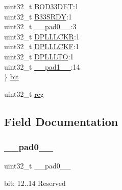 \begin{DoxyCompactItemize}
\begin{tabbing}
\>uint32\_t \mbox{\hyperlink{union_s_y_s_c_t_r_l___i_n_t_e_n_c_l_r___type_afe0d01af66ae30fcd7f3c61067b2bef1}{BOD33DET}}:1\\
\>uint32\_t \mbox{\hyperlink{union_s_y_s_c_t_r_l___i_n_t_e_n_c_l_r___type_a001eb8c699a22ed1e8addd422b0068ae}{B33SRDY}}:1\\
\>uint32\_t \mbox{\hyperlink{union_s_y_s_c_t_r_l___i_n_t_e_n_c_l_r___type_a3e57c2ef1c3ffb36722f000cc1156824}{\_\_pad0\_\_}}:3\\
\>uint32\_t \mbox{\hyperlink{union_s_y_s_c_t_r_l___i_n_t_e_n_c_l_r___type_a0971d1b5df18859d93257da5c619eb64}{DPLLLCKR}}:1\\
\>uint32\_t \mbox{\hyperlink{union_s_y_s_c_t_r_l___i_n_t_e_n_c_l_r___type_ab73a8dbca12f32aad2cc241099afc49f}{DPLLLCKF}}:1\\
\>uint32\_t \mbox{\hyperlink{union_s_y_s_c_t_r_l___i_n_t_e_n_c_l_r___type_ac0397fe777ae420afce8c8ddc23dc843}{DPLLLTO}}:1\\
\>uint32\_t \mbox{\hyperlink{union_s_y_s_c_t_r_l___i_n_t_e_n_c_l_r___type_a6712ba6dd1d5b43d2d56ff8ac4e275a7}{\_\_pad1\_\_}}:14\\
\} \mbox{\hyperlink{union_s_y_s_c_t_r_l___i_n_t_e_n_c_l_r___type_af911c5a0ca56e0ea88635e3012b08fb3}{bit}}\\

\end{tabbing}\item 
uint32\+\_\+t \mbox{\hyperlink{union_s_y_s_c_t_r_l___i_n_t_e_n_c_l_r___type_a6b91636401516a477989a336376d7b40}{reg}}
\end{DoxyCompactItemize}


\subsection{Field Documentation}
\mbox{\label{union_s_y_s_c_t_r_l___i_n_t_e_n_c_l_r___type_a3e57c2ef1c3ffb36722f000cc1156824}} 
\subsubsection{\texorpdfstring{\_\_pad0\_\_}{\_\_pad0\_\_}}
{\footnotesize\ttfamily uint32\+\_\+t \+\_\+\+\_\+pad0\+\_\+\+\_\+}

bit\+: 12..14 Reserved \mbox{\label{union_s_y_s_c_t_r_l___i_n_t_e_n_c_l_r___type_a6712ba6dd1d5b43d2d56ff8ac4e275a7}} 
